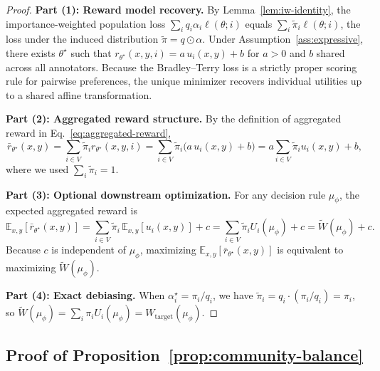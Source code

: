 \documentclass{article}
\theoremstyle{plain}
\theoremstyle{definition}
\theoremstyle{remark}
\begin{document}
\begin{proof}
\textbf{Part (1): Reward model recovery.}
By Lemma~\ref{lem:iw-identity}, the importance-weighted population loss
$\sum_i q_i \alpha_i \ell(\theta; i)$ equals $\sum_i \tilde\pi_i \ell(\theta; i)$,
the loss under the induced distribution $\tilde\pi = q \odot \alpha$.
Under Assumption~\ref{ass:expressive}, there exists $\theta^\star$ such that
$r_{\theta^\star}(x,y,i) = a \, u_i(x,y) + b$ for $a > 0$ and $b$ shared across
all annotators.
Because the Bradley--Terry loss is a strictly proper scoring rule for pairwise
preferences, the unique minimizer
recovers individual utilities up to a shared affine transformation.

\textbf{Part (2): Aggregated reward structure.}
By the definition of aggregated reward in Eq.~\eqref{eq:aggregated-reward},
\begin{equation}
    \bar r_{\theta^\star}(x,y)
    =
    \sum_{i \in V} \tilde\pi_i r_{\theta^\star}(x,y,i)
    =
    \sum_{i \in V} \tilde\pi_i \big(a \, u_i(x,y) + b\big)
    =
    a \sum_{i \in V} \tilde\pi_i u_i(x,y) + b,
\end{equation}
where we used $\sum_i \tilde\pi_i = 1$.

\textbf{Part (3): Optional downstream optimization.}
For any decision rule $\mu_\phi$, the expected aggregated reward is
\begin{equation}
    \mathbb{E}_{x,y}[\bar r_{\theta^\star}(x,y)]
    =
    \sum_{i \in V} \tilde\pi_i \, \mathbb{E}_{x,y}[u_i(x,y)] + c
    =
    \sum_{i \in V} \tilde\pi_i U_i(\mu_\phi) + c
    =
    \widetilde{W}(\mu_\phi) + c.
\end{equation}
Because $c$ is independent of $\mu_\phi$, maximizing
$\mathbb{E}_{x,y}[\bar r_{\theta^\star}(x,y)]$ is equivalent to maximizing
$\widetilde{W}(\mu_\phi)$.

\textbf{Part (4): Exact debiasing.}
When $\alpha_i^\star = \pi_i / q_i$, we have
$\tilde\pi_i = q_i \cdot (\pi_i / q_i) = \pi_i$, so
$\widetilde{W}(\mu_\phi) = \sum_i \pi_i U_i(\mu_\phi) = W_{\text{target}}(\mu_\phi)$.
\end{proof}

\subsection{Proof of Proposition~\ref{prop:community-balance}}
\label{app:proof-community}
\end{document}
